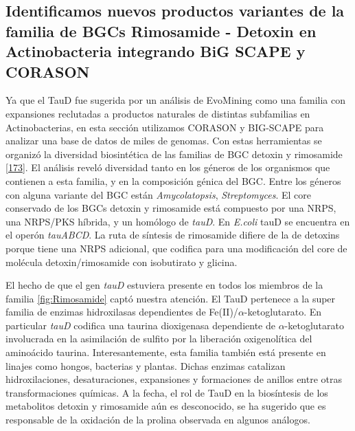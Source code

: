 \documentclass[12pt,twoside]{reedthesis}
\begin{document}
  \subsection{Identificamos nuevos productos variantes de la familia de
  BGCs Rimosamide - Detoxin en Actinobacteria integrando BiG SCAPE y
  CORASON}\label{identificamos-nuevos-productos-variantes-de-la-familia-de-bgcs-rimosamide---detoxin-en-actinobacteria-integrando-big-scape-y-corason}
  
  Ya que el TauD fue sugerida por un análisis de EvoMining como una
  familia con expansiones reclutadas a productos naturales de distintas
  subfamilias en Actinobacterias, en esta sección utilizamos CORASON y
  BIG-SCAPE para analizar una base de datos de miles de genomas. Con estas
  herramientas se organizó la diversidad biosintética de las familias de
  BGC detoxin y rimosamide
  {[}\protect\hyperlink{ref-mcclure_elucidating_2016}{173}{]}. El análisis
  reveló diversidad tanto en los géneros de los organismos que contienen a
  esta familia, y en la composición génica del BGC. Entre los géneros con
  alguna variante del BGC están \emph{Amycolatopsis}, \emph{Streptomyces}.
  El core conservado de los BGCs detoxin y rimosamide está compuesto por
  una NRPS, una NRPS/PKS híbrida, y un homólogo de \emph{tauD}. En
  \emph{E.coli} tauD se encuentra en el operón \emph{tauABCD}. La ruta de
  síntesis de rimosamide difiere de la de detoxins porque tiene una NRPS
  adicional, que codifica para una modificación del core de molécula
  detoxin/rimosamide con isobutirato y glicina.
  
  El hecho de que el gen \emph{tauD} estuviera presente en todos los
  miembros de la familia \autoref{fig:Rimosamide} captó nuestra atención.
  El TauD pertenece a la super familia de enzimas hidroxilasas
  dependientes de Fe(II)/\(\alpha\)-ketoglutarato. En particular
  \emph{tauD} codifica una taurina dioxigenasa dependiente de
  \(\alpha\)-ketoglutarato involucrada en la asimilación de sulfito por la
  liberación oxigenolítica del aminoácido taurina. Interesantemente, esta
  familia también está presente en linajes como hongos, bacterias y
  plantas. Dichas enzimas catalizan hidroxilaciones, desaturaciones,
  expansiones y formaciones de anillos entre otras transformaciones
  químicas. A la fecha, el rol de TauD en la biosíntesis de los
  metabolitos detoxin y rimosamide aún es desconocido, se ha sugerido que
  es responsable de la oxidación de la prolina observada en algunos
  análogos.
  
\end{document}
